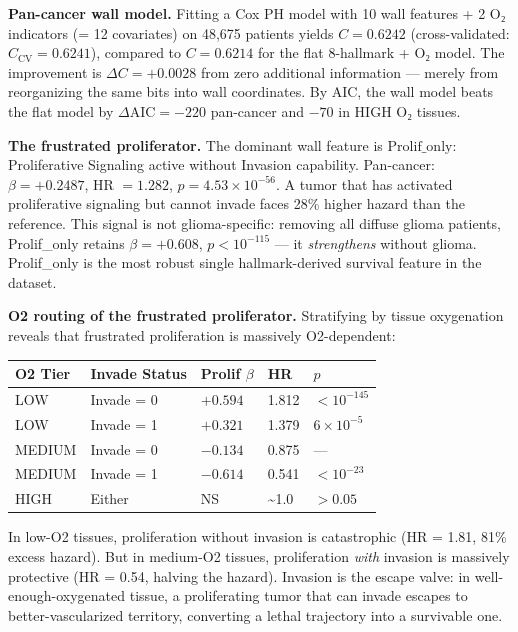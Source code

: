 \documentclass[
  11pt,
]{article}
\newcounter{none} %
\begin{document}
\textbf{Pan-cancer wall model.} Fitting a Cox PH model with 10 wall
features + 2 O₂ indicators (= 12 covariates) on 48,675 patients yields
\(C = 0.6242\) (cross-validated: \(C_\mathrm{CV} = 0.6241\)), compared
to \(C = 0.6214\) for the flat 8-hallmark + O₂ model. The improvement is
\(\Delta C = +0.0028\) from zero additional information --- merely from
reorganizing the same bits into wall coordinates. By AIC, the wall model
beats the flat model by \(\Delta\mathrm{AIC} = -220\) pan-cancer and
\(-70\) in HIGH O₂ tissues.

\textbf{The frustrated proliferator.} The dominant wall feature is
\(\mathrm{Prolif\_only}\): Proliferative Signaling active without
Invasion capability. Pan-cancer: \(\beta = +0.2487\), HR \(= 1.282\),
\(p = 4.53 \times 10^{-56}\). A tumor that has activated proliferative
signaling but cannot invade faces 28\% higher hazard than the reference.
This signal is not glioma-specific: removing all diffuse glioma
patients, Prolif\_only retains \(\beta = +0.608\), \(p < 10^{-115}\) ---
it \emph{strengthens} without glioma. Prolif\_only is the most robust
single hallmark-derived survival feature in the dataset.

\textbf{O2 routing of the frustrated proliferator.} Stratifying by
tissue oxygenation reveals that frustrated proliferation is massively
O2-dependent:

{\def\LTcaptype{none} %
\begin{longtable}[]{@{}lllll@{}}
\toprule\noalign{}
O2 Tier & Invade Status & Prolif \(\beta\) & HR & \(p\) \\
\midrule\noalign{}
\endhead
\bottomrule\noalign{}
\endlastfoot
LOW & Invade = 0 & \(+0.594\) & 1.812 & \(< 10^{-145}\) \\
LOW & Invade = 1 & \(+0.321\) & 1.379 & \(6 \times 10^{-5}\) \\
MEDIUM & Invade = 0 & \(-0.134\) & 0.875 & --- \\
MEDIUM & Invade = 1 & \(-0.614\) & 0.541 & \(< 10^{-23}\) \\
HIGH & Either & NS & \textasciitilde1.0 & \(> 0.05\) \\
\end{longtable}
}

In low-O2 tissues, proliferation without invasion is catastrophic (HR =
1.81, 81\% excess hazard). But in medium-O2 tissues, proliferation
\emph{with} invasion is massively protective (HR = 0.54, halving the
hazard). Invasion is the escape valve: in well-enough-oxygenated tissue,
a proliferating tumor that can invade escapes to better-vascularized
territory, converting a lethal trajectory into a survivable one.
\end{document}
